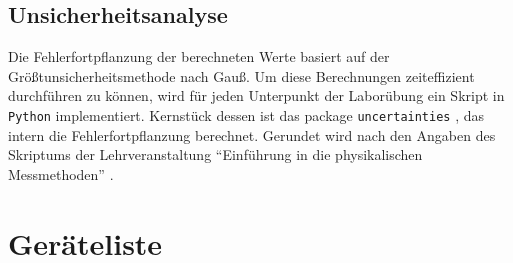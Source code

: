 \documentclass[ngerman]{scrartcl}
\begin{document}
\subsection{Unsicherheitsanalyse}
\label{subsec:unsicherheitsanalyse}

Die Fehlerfortpflanzung der berechneten Werte basiert auf der Größtunsicherheitsmethode nach Gauß. Um diese Berechnungen zeiteffizient durchführen zu können, wird für jeden Unterpunkt der Laborübung ein Skript in \verb!Python! implementiert. Kernstück dessen ist das package \verb!uncertainties! \cite{ref:uncertainties}, das intern die Fehlerfortpflanzung berechnet. Gerundet wird nach den Angaben des Skriptums der Lehrveranstaltung \enquote{Einführung in die physikalischen Messmethoden} \cite{ref:messmethoden}.



\section{Geräteliste}
\label{sec:geraeteliste}
\end{document}

